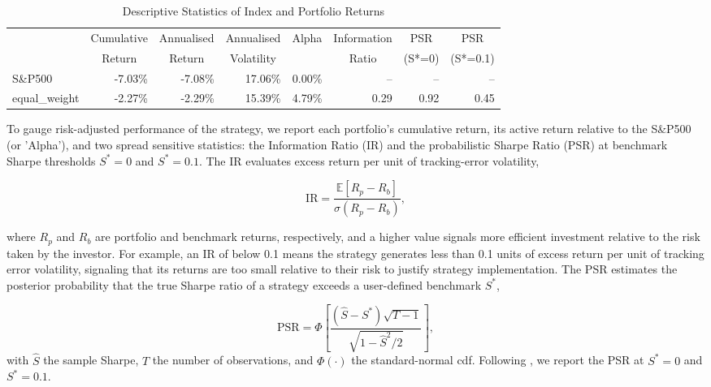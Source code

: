 \begin{table}[ht]
\centering
\caption{Descriptive Statistics of Index and Portfolio Returns}
\label{tab:return_stats_1}
\begin{tabular}{lrrrrrrr}
\toprule
{} & \multicolumn{1}{c}{Cumulative} & \multicolumn{1}{c}{Annualised} & \multicolumn{1}{c}{Annualised} & \multicolumn{1}{c}{Alpha} & \multicolumn{1}{c}{Information} & \multicolumn{1}{c}{PSR} & \multicolumn{1}{c}{PSR} \\
{} & \multicolumn{1}{c}{Return} & \multicolumn{1}{c}{Return} & \multicolumn{1}{c}{Volatility} & {} & \multicolumn{1}{c}{Ratio} & \multicolumn{1}{c}{(S*=0)} & \multicolumn{1}{c}{(S*=0.1)} \\
\midrule
S\&P500 & -7.03\% & -7.08\% & 17.06\% & 0.00\% & -- & -- & -- \\
equal\_weight & -2.27\% & -2.29\% & 15.39\% & 4.79\% & 0.29 & 0.92 & 0.45 \\
\bottomrule
\end{tabular}
\end{table}


To gauge risk-adjusted performance of the strategy, we report each portfolio's cumulative return, its active return relative to the S\&P500 (or 'Alpha'), and two spread sensitive statistics: the Information Ratio (IR) and the probabilistic Sharpe Ratio (PSR) at benchmark Sharpe thresholds $S^{*}=0$ and $S^{*}=0.1$. The IR evaluates excess return per unit of tracking-error volatility,

\begin{equation}
\mathrm{IR}=\frac{\mathbb{E}\left[R_{p}-R_{b}\right]}{\sigma\left(R_{p}-R_{b}\right)},
\end{equation}

where $R_{p}$ and $R_{b}$ are portfolio and benchmark returns, respectively, and a higher value signals more efficient investment relative to the risk taken by the investor. For example, an IR of below 0.1 means the strategy generates less than 0.1 units of excess return per unit of tracking error volatility, signaling that its returns are too small relative to their risk to justify strategy implementation. The PSR estimates the posterior probability that the true Sharpe ratio of a strategy exceeds a user-defined benchmark $S^{*}$,

\begin{equation}
\mathrm{PSR}= \Phi\left[\frac{\left(\hat{S}-S^{*}\right)\sqrt{T-1}}{\sqrt{1-\hat{S}^{2}/2}}\right],
\end{equation}
with $\hat{S}$ the sample Sharpe, $T$ the number of observations, and $\Phi(\cdot)$ the standard-normal cdf. Following , we report the PSR at $S^{*}=0$ and $S^{*}=0.1$.


